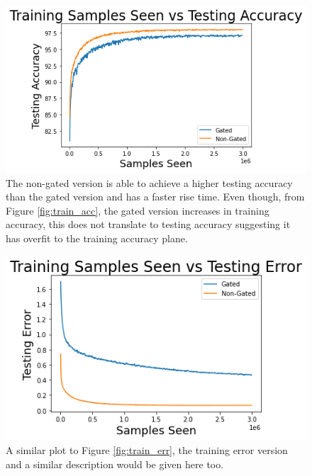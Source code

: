 \documentclass[prl,superscriptaddress,showpacs,twocolumn]{revtex4-1}
\begin{document}
\begin{figure}[H]
    \centering
    \includegraphics[width=\linewidth]{figures/samples_vs_testing_accuracy.png}
    \caption{The non-gated version is able to achieve a higher testing accuracy than the gated version and has a faster rise time. Even though, from Figure \ref{fig:train_acc}, the gated version increases in training accuracy, this does not translate to testing accuracy suggesting it has overfit to the training accuracy plane.}
    \label{fig:test_acc}
\end{figure}

\begin{figure}[H]
    \centering
    \includegraphics[width=\linewidth]{figures/samples_vs_testing_error.png}
    \caption{A similar plot to Figure \ref{fig:train_err}, the training error version and a similar description would be given here too.}
    \label{fig:test_err}
\end{figure}
\end{document}
